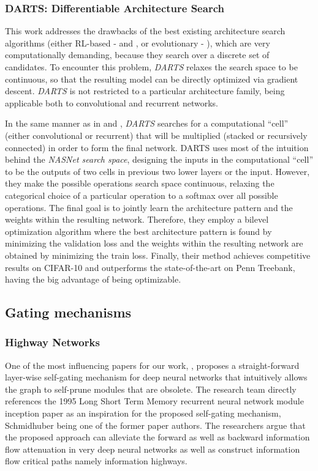 \documentclass[conference]{IEEEtran}
\begin{document}
\subsubsection{DARTS: Differentiable Architecture Search}
\label{summary:darts}

This work \cite{Liu2018} addresses the drawbacks of the best existing architecture search algorithms (either RL-based - \cite{Zoph2017} and \cite{Zoph2018}, or evolutionary - \cite{Real2018}), which are very computationally demanding, because they search over a discrete set of candidates. To encounter this problem, \textit{DARTS} relaxes the search space to be continuous, so that the resulting model can be directly optimized via gradient descent. \textit{DARTS} is not restricted to a particular architecture family, being applicable both to convolutional and recurrent networks.

In the same manner as in \cite{Zoph2018} and \cite{Real2018}, \textit{DARTS} searches for a computational “cell” (either convolutional or recurrent) that will be multiplied (stacked or recursively connected) in order to form the final network. DARTS uses most of the intuition behind the \textit{NASNet search space}, designing the inputs in the computational “cell” to be the outputs of two cells in previous two lower layers or the input. However, they make the possible operations search space continuous, relaxing the categorical choice of a particular operation to a softmax over all possible operations. The final goal is to jointly learn the architecture pattern and the weights within the resulting network. Therefore, they employ a bilevel optimization algorithm where the best architecture pattern is found by minimizing the validation loss and the weights within the resulting network are obtained by minimizing the train loss. Finally, their method achieves competitive results on CIFAR-10 and outperforms the state-of-the-art on Penn Treebank, having the big advantage of being optimizable.


\subsection{Gating mechanisms}

\subsubsection{Highway Networks}
\label{summary:highway}

One of the most influencing papers for our work, \cite{srivastava2015highway}, proposes a straight-forward layer-wise self-gating mechanism for deep neural networks that intuitively allows the graph to self-prune modules that are obsolete. The research team directly references the 1995 Long Short Term Memory recurrent neural network module inception paper \cite{Hochreiter1997} as an inspiration for the proposed self-gating mechanism, Schmidhuber being one of the former paper authors. The researchers argue that the proposed approach can alleviate the forward as well as backward information flow attenuation in very deep neural networks as well as construct information flow critical paths namely information highways. 
\end{document}
